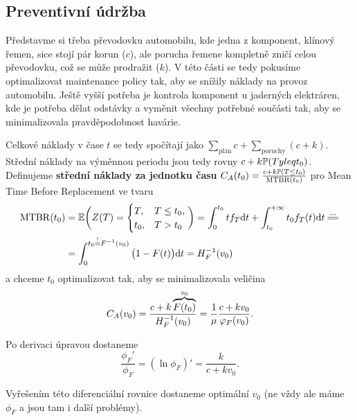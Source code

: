 \subsection{Preventivní údržba}
Představme si třeba převodovku automobilu, kde jedna z komponent, klínový řemen, sice stojí pár korun ($c$), ale porucha řemene kompletně zničí celou převodovku, což se může prodražit ($k$). V této části se tedy pokusíme optimalizovat maintenance policy tak, aby se snížily náklady na provoz automobilu. Ještě vyšší potřeba je kontrola komponent u jaderných elektráren, kde je potřeba dělat odstávky a vyměnit všechny potřebné součásti tak, aby se minimalizovala pravděpodobnost havárie.

Celkové náklady v čase $t$ se tedy spočítají jako $\sum_{\text{plán}}c+\sum_{\text{poruchy}}(c+k)$. Střední náklady na výměnnou periodu jsou tedy rovny $c+k\mathbb{P}(Tyleq t_0)$. Definujeme \textbf{střední náklady za jednotku času} $C_A(t_0)=\frac{c+k\mathbb{P}(T\leq t_0)}{\mathrm{MTBR}(t_0)}$ pro Mean Time Before Replacement ve tvaru \[
\begin{split}
\mathrm{MTBR}(t_0)&=\E\bigg(Z(T)=\begin{cases}
T,& T\leq t_0,\\ t_0,& T>t_0
\end{cases}\bigg)=\int_{0}^{t_0}tf_T\d t+\int_{t_0}^{+\infty}t_0 f_T(t)\d t\equal{...} \\ &= \int_{0}^{t_0\stackrel{!}{=}\inv{F}(v_0)}\big(1-F(t)\big)\d t=\HF(v_0) 
\end{split}
\]  a chceme $t_0$ optimalizovat tak, aby se minimalizovala veličina $$C_A(v_0)=\frac{c+k\overbrace{F(t_0)}^{v_0}}{H_F^{-1}(v_0)}=\frac{1}{\mu}\frac{c+kv_0}{\varphi_F(v_0)}.$$

Po derivaci úpravou dostaneme 
$$ \frac{\phi_F'}{\phi_F}=(\ln \phi_F)'=\frac{k}{c+kv_0}.$$

Vyřešením této diferenciální rovnice dostaneme optimální $v_0$ (ne vždy ale máme $\phi_F$ a jsou tam i další problémy).
